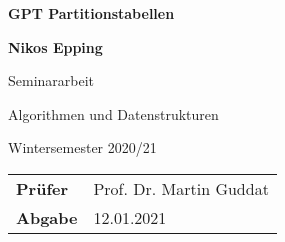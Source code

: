 \begin{titlepage}
    \begin{center}
        \vspace{2cm}
            
        \Huge
        \textbf{GPT Partitionstabellen}
            
        \vspace{1cm}
            
        \Large
        \textbf{Nikos Epping}
            
   		\vspace{0.8cm}
            
        Seminararbeit
        
        \large 
        Algorithmen und Datenstrukturen

        Wintersemester 2020/21

        \vspace{2cm}

        \begin{center}
        \begin{tabular}{ p{2.5cm} l }
            \textbf{Prüfer} & Prof. Dr. Martin Guddat \\
            \textbf{Abgabe} & 12.01.2021
            \end{tabular}
        \end{center}

        \vfill
            
        
            
    \end{center}
\end{titlepage}
